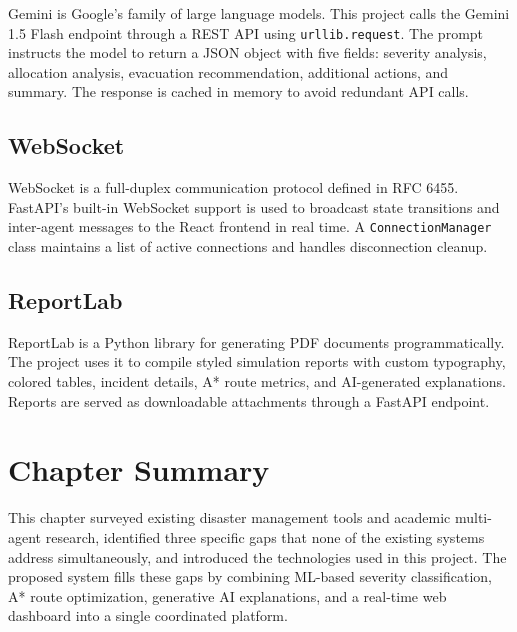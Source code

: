 Gemini is Google's family of large language models. This project calls the Gemini 1.5 Flash endpoint through a REST API using \texttt{urllib.request}. The prompt instructs the model to return a JSON object with five fields: severity analysis, allocation analysis, evacuation recommendation, additional actions, and summary. The response is cached in memory to avoid redundant API calls.

\subsection{WebSocket}

WebSocket is a full-duplex communication protocol defined in RFC 6455. FastAPI's built-in WebSocket support is used to broadcast state transitions and inter-agent messages to the React frontend in real time. A \texttt{ConnectionManager} class maintains a list of active connections and handles disconnection cleanup.

\subsection{ReportLab}

ReportLab is a Python library for generating PDF documents programmatically. The project uses it to compile styled simulation reports with custom typography, colored tables, incident details, A* route metrics, and AI-generated explanations. Reports are served as downloadable attachments through a FastAPI endpoint.

\section{Chapter Summary}
\label{sec:ch2_summary}

This chapter surveyed existing disaster management tools and academic multi-agent research, identified three specific gaps that none of the existing systems address simultaneously, and introduced the technologies used in this project. The proposed system fills these gaps by combining ML-based severity classification, A* route optimization, generative AI explanations, and a real-time web dashboard into a single coordinated platform.
